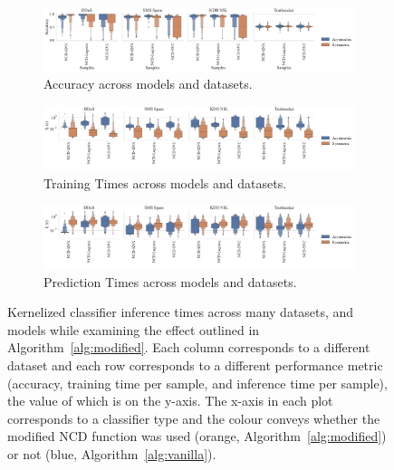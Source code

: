 \documentclass[conference]{IEEEtran}
\begin{document}
\begin{figure}[htb]
    \centering
    \begin{subfigure}[htb]{\textwidth}
        \includegraphics[width=\textwidth]{figs/combined/symmetric_models_vs_accuracy.pdf}
        \caption{Accuracy across models and datasets.}
        \label{fig:mod_acc}
    \end{subfigure}
    \begin{subfigure}[htb]{\textwidth}
        \centering
        \includegraphics[width=\textwidth]{figs/combined/symmetric_models_vs_train_time.pdf}
        \caption{Training Times across models and datasets.}
        \label{fig:mod_train_time}
    \end{subfigure}
    \begin{subfigure}[htb]{\textwidth}
        \includegraphics[width=\textwidth]{figs/combined/symmetric_models_vs_predict_time.pdf}
        \caption{Prediction Times across models and datasets.}
        \label{fig:mod_pred_time}
    \end{subfigure}
    \caption{Kernelized classifier inference times across many datasets, and models while examining the effect outlined in Algorithm~\ref{alg:modified}. Each column corresponds to a different dataset and each row corresponds to a different performance metric (accuracy, training time per sample, and inference time per sample), the value of which is on the y-axis. The x-axis in each plot corresponds to a classifier type and the colour conveys whether the modified NCD function  was used (orange, Algorithm~\ref{alg:modified}) or not (blue, Algorithm~\ref{alg:vanilla}).}
    \label{fig:mod_summary}
\end{figure}
\end{document}
